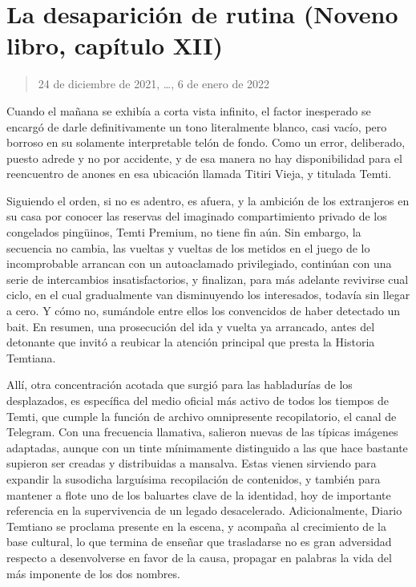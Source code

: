 \documentclass[
]{book}
\begin{document}
\hypertarget{la-desapariciuxf3n-de-rutina-noveno-libro-capuxedtulo-xii}{%
\section{La desaparición de rutina (Noveno libro, capítulo XII)}\label{la-desapariciuxf3n-de-rutina-noveno-libro-capuxedtulo-xii}}

\begin{quote}
24 de diciembre de 2021, \ldots, 6 de enero de 2022
\end{quote}

Cuando el mañana se exhibía a corta vista infinito, el factor inesperado se encargó de darle definitivamente un tono literalmente blanco, casi vacío, pero borroso en su solamente interpretable telón de fondo. Como un error, deliberado, puesto adrede y no por accidente, y de esa manera no hay disponibilidad para el reencuentro de anones en esa ubicación llamada Titiri Vieja, y titulada Temti.

Siguiendo el orden, si no es adentro, es afuera, y la ambición de los extranjeros en su casa por conocer las reservas del imaginado compartimiento privado de los congelados pingüinos, Temti Premium, no tiene fin aún. Sin embargo, la secuencia no cambia, las vueltas y vueltas de los metidos en el juego de lo incomprobable arrancan con un autoaclamado privilegiado, continúan con una serie de intercambios insatisfactorios, y finalizan, para más adelante revivirse cual ciclo, en el cual gradualmente van disminuyendo los interesados, todavía sin llegar a cero. Y cómo no, sumándole entre ellos los convencidos de haber detectado un bait. En resumen, una prosecución del ida y vuelta ya arrancado, antes del detonante que invitó a reubicar la atención principal que presta la Historia Temtiana.

Allí, otra concentración acotada que surgió para las habladurías de los desplazados, es específica del medio oficial más activo de todos los tiempos de Temti, que cumple la función de archivo omnipresente recopilatorio, el canal de Telegram. Con una frecuencia llamativa, salieron nuevas de las típicas imágenes adaptadas, aunque con un tinte mínimamente distinguido a las que hace bastante supieron ser creadas y distribuidas a mansalva. Estas vienen sirviendo para expandir la susodicha larguísima recopilación de contenidos, y también para mantener a flote uno de los baluartes clave de la identidad, hoy de importante referencia en la supervivencia de un legado desacelerado. Adicionalmente, Diario Temtiano se proclama presente en la escena, y acompaña al crecimiento de la base cultural, lo que termina de enseñar que trasladarse no es gran adversidad respecto a desenvolverse en favor de la causa, propagar en palabras la vida del más imponente de los dos nombres.
\end{document}

